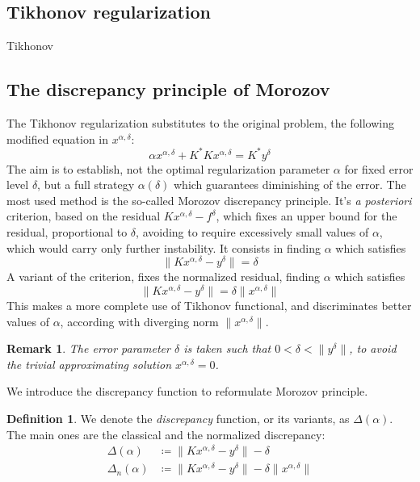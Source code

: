 \documentclass[10pt, a4paper, twoside, openright]{book}
\theoremstyle{definition}
\newtheorem{definition}[subsection]{Definition}
\theoremstyle{plain}
\theoremstyle{plain}
\theoremstyle{plain}
\theoremstyle{plain}
\newtheorem{remark}[subsection]{Remark}
\theoremstyle{plain}
\theoremstyle{plain}
\theoremstyle{plain}
\theoremstyle{plain}
\begin{document}
\subsection{Tikhonov regularization}
Tikhonov
\subsection{The discrepancy principle of Morozov}
The Tikhonov regularization substitutes to the original problem, the following modified equation in $x^{\alpha, \delta}$:
\begin{equation}
\label{eq:tikh-equation-2}
 \alpha x^{\alpha, \delta} + K^*Kx^{\alpha, \delta} = K^*y^\delta
\end{equation}
The aim is to establish, not the optimal regularization parameter $\alpha$ for fixed error level $\delta$, but a full strategy $\alpha(\delta)$ which guarantees diminishing of the error. The most used method is the so-called Morozov discrepancy principle. It's \emph{a posteriori} criterion, based on the residual $Kx^{\alpha,\delta} - f^\delta$, which fixes an upper bound for the residual, proportional to $\delta$, avoiding to require excessively small values of $\alpha$, which would carry only further instability. It consists in finding $\alpha$ which satisfies
\begin{equation}
\label{eq:discrepancy-zero}
 \|Kx^{\alpha, \delta} - y ^\delta \|= \delta
\end{equation}
A variant of the criterion, fixes the normalized residual, finding $\alpha$ which satisfies
\begin{equation}
\label{eq:discrepancy-relative-zero}
 \|Kx^{\alpha, \delta} - y ^\delta \|= \delta\|x^{\alpha,\delta}\|
\end{equation}
This makes a more complete use of Tikhonov functional, and discriminates better values of $\alpha$, according with diverging norm $\|x^{\alpha,\delta}\|$.
\begin{remark}
 The error parameter $\delta$ is taken such that $0<\delta<\|y^\delta\|$, to avoid the trivial approximating solution $x^{\alpha,\delta}= 0$.
\end{remark}
We introduce the discrepancy function to reformulate Morozov principle.
\begin{definition}
 We denote the \emph{discrepancy} function, or its variants, as $\Delta(\alpha)$. The main ones are the classical and the normalized discrepancy:
 \begin{align}
  \Delta(\alpha)&\coloneqq\|Kx^{\alpha,\delta} - y^\delta\| - \delta \\
  \Delta_n(\alpha)&\coloneqq\|Kx^{\alpha,\delta} - y^\delta\| - \delta\|x^{\alpha,\delta}\|
 \end{align}
\end{definition}
\end{document}
